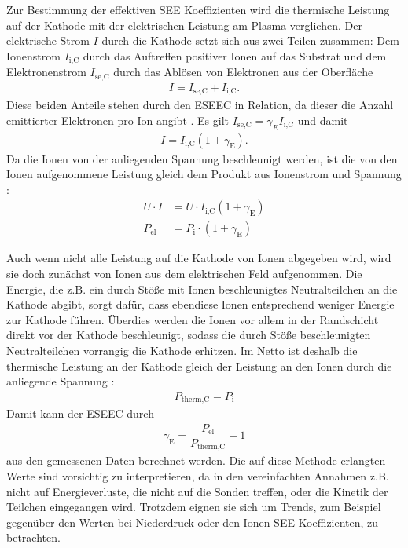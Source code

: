 Zur Bestimmung der effektiven SEE Koeffizienten wird die thermische Leistung auf der Kathode mit der elektrischen Leistung am Plasma verglichen. Der elektrische Strom $ I $ durch die Kathode setzt sich aus zwei Teilen zusammen: Dem Ionenstrom $ I_\text{i,C} $ durch das Auftreffen positiver Ionen auf das Substrat und dem Elektronenstrom $ I_\text{se,C} $ durch das Ablösen von Elektronen aus der Oberfläche \cite{liebermanPrinciplesPlasmaDischarges2005,chapmanGlowDischargeProcesses1980a,phelpsColdcathodeDischargesBreakdown1999}
\begin{align*}
	I = I_{\text{se,C}} + I_{\text{i,C}}.
\end{align*}
Diese beiden Anteile stehen durch den ESEEC in Relation, da dieser die Anzahl emittierter Elektronen pro Ion angibt \cite{arumugamEffectiveSecondaryElectron2017}. Es gilt $ I_{\text{se,C}} = \gamma_E I_{\text{i,C}}$ und damit
\begin{align*}
	I = I_{\text{i,C}} (1+\gamma_\text{E}).
\end{align*}
Da die Ionen von der anliegenden Spannung beschleunigt werden, ist die von den Ionen aufgenommene Leistung gleich dem Produkt aus Ionenstrom und Spannung \cite{kerstenEnergyBalanceSubstrate2001, arumugamEffectiveSecondaryElectron2017}:
\begin{align*}
	U \cdot I &= U\cdot I_{\text{i,C}}(1+\gamma_\text{E})\\ 
	P_{\text{el}} &= P_\text{i} \cdot (1+\gamma_\text{E})
\end{align*}

Auch wenn nicht alle Leistung auf die Kathode von Ionen abgegeben wird, wird sie doch zunächst von Ionen aus dem elektrischen Feld aufgenommen. Die Energie, die z.B. ein durch Stöße mit Ionen beschleunigtes Neutralteilchen an die Kathode abgibt, sorgt dafür, dass ebendiese Ionen entsprechend weniger Energie zur Kathode führen. Überdies werden die Ionen vor allem in der Randschicht direkt vor der Kathode beschleunigt, sodass die durch Stöße beschleunigten Neutralteilchen vorrangig die Kathode erhitzen. Im Netto ist deshalb die thermische Leistung an der Kathode gleich der Leistung an den Ionen durch die anliegende Spannung \cite{sheridanCollisionalPlasmaSheath1991,arumugamEffectiveSecondaryElectron2017,trottenbergMeasurementForceExerted2015a}:
\begin{align*}
	P_\text{therm,C} = P_\text{i}
\end{align*}
Damit kann der ESEEC durch
\begin{align*}
	\gamma_\text{E} = \dfrac{P_\text{el}}{P_\text{therm,C}} -1 
\end{align*}
aus den gemessenen Daten berechnet werden. Die auf diese Methode erlangten Werte sind vorsichtig zu interpretieren, da in den vereinfachten Annahmen z.B. nicht auf Energieverluste, die nicht auf die Sonden treffen, oder die Kinetik der Teilchen \cite{phelpsColdcathodeDischargesBreakdown1999, phelpsUseSecondaryelectronYields1999} eingegangen wird. Trotzdem eignen sie sich um Trends, zum Beispiel gegenüber den Werten bei Niederdruck oder den Ionen-SEE-Koeffizienten, zu betrachten.

